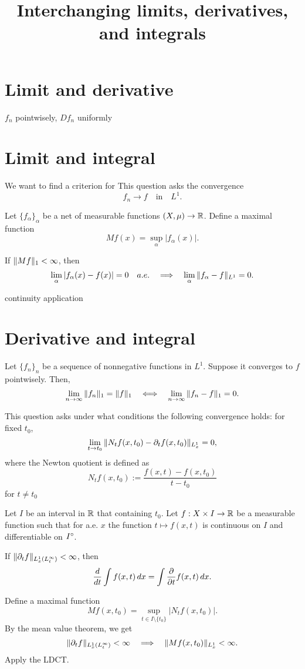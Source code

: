 \documentclass{../exp}
\title{Interchanging limits, derivatives, and integrals}
\begin{document}
\maketitle

\section{Limit and derivative}

$f_n$ pointwisely, $Df_n$ uniformly








\section{Limit and integral}
We want to find a criterion for 
This question asks the convergence
\[f_n\to f\quad\text{in}\quad L^1.\]

\begin{thm}
Let $\{f_\alpha\}_\alpha$ be a net of measurable functions $(X,\mu)\to\R$.
Define a maximal function
\[Mf(x)=\sup_\alpha|f_\alpha(x)|.\]

If $\|Mf\|_1<\infty$, then
\[\lim_\alpha|f_\alpha(x)-f(x)|=0\quad a.e.\impl\lim_\alpha\|f_\alpha-f\|_{L^1}=0.\]
\end{thm}

continuity application








\section{Derivative and integral}

\begin{thm}[Scheffe]
Let $\{f_n\}_n$ be a sequence of nonnegative functions in $L^1$.
Suppose it converges to $f$ pointwisely.
Then,
\[\lim_{n\to\oo}\|f_n\|_1=\|f\|_1\iff\lim_{n\to\oo}\|f_n-f\|_1=0.\]
\end{thm}


This question asks under what conditions the following convergence holds: for fixed $t_0$,
\[\lim_{t\to t_0}\|N_tf(x,t_0)-\pd_tf(x,t_0)\|_{L_x^1}=0,\]
where the Newton quotient is defined as
\[N_tf(x,t_0):=\frac{f(x,t)-f(x,t_0)}{t-t_0}\]
for $t\ne t_0$

\begin{thm}
Let $I$ be an interval in $\mathbb{R}$ that containing $t_0$.
Let $f:X\x I\to\R$ be a measurable function such that for a.e. $x$ the function $t\mapsto f(x,t)$ is continuous on $I$ and differentiable on $I^\circ$.

If $\|\pd_tf\|_{L_x^1(L_t^\oo)}<\oo$, then
\[\dd{t}\int f(x,t)\,dx=\int\pd{t}f(x,t)\,dx.\]
\end{thm}
\begin{pf}
Define a maximal function
\[Mf(x,t_0)=\sup_{t\in I\setminus\{t_0\}}|N_tf(x,t_0)|.\]
By the mean value theorem, we get
\[\|\pd_tf\|_{L_x^1(L_t^\oo)}<\oo\impl\|Mf(x,t_0)\|_{L_x^1}<\oo.\]
Apply the LDCT.
\end{pf}
\end{document}
